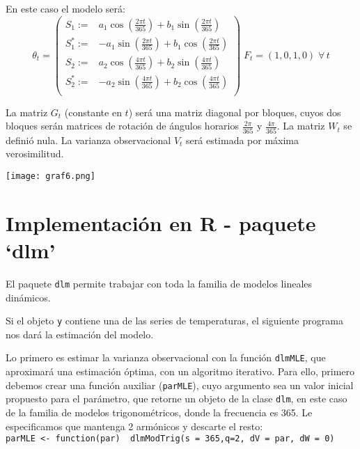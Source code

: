 \documentclass{article}
\begin{document}
En este caso el modelo será:
$$\theta_t=\left(\begin{array}{lr}
S_1:=& a_1\cos\left(\frac{2\pi t}{365}\right) + b_1 \sin\left(\frac{2\pi t}{365}\right) \\
S_1^*:=& -a_1\sin\left(\frac{2\pi t}{365}\right) + b_1 \cos\left(\frac{2\pi t}{365}\right) \\
S_2:= &a_2\cos\left(\frac{4\pi t}{365}\right) + b_2 \sin\left(\frac{4\pi t}{365}\right) \\
S_2^*:=& -a_2\sin\left(\frac{4\pi t}{365}\right) + b_2 \cos\left(\frac{4\pi t}{365}\right) \\
\end{array}\right)\; F_t=(1,0,1,0) \; \forall \, t$$

La matriz $G_t$ (constante en $t$) será una matriz diagonal por bloques, cuyos dos bloques serán matrices de rotación de ángulos horarios $\frac{2\pi}{365}$ y $\frac{4\pi}{365}$. La matriz $W_t$ se definió nula. La varianza observacional $V_t$ será estimada por máxima verosimilitud.

\begin{center}
\texttt{[image: graf6.png]}
\vspace{-.75em}
\label{fig:graf6}
\end{center}


\section{Implementación en R - paquete `dlm'}

El paquete \verb|dlm| permite trabajar con toda la familia de modelos lineales dinámicos. %

Si el objeto \verb|y| contiene una de las series de temperaturas, el siguiente programa nos dará la estimación del modelo.

Lo primero es estimar la varianza observacional con la función \verb|dlmMLE|, que aproximará una estimación óptima, con un algoritmo iterativo. Para ello, primero debemos crear una función auxiliar (\verb|parMLE|), cuyo argumento sea un valor inicial propuesto para el parámetro, que retorne un objeto de la clase \verb|dlm|, en este caso de la familia de modelos trigonométricos, donde la frecuencia es 365. Le especificamos que mantenga 2 armónicos y descarte el resto:\\
\verb|parMLE <- function(par)  dlmModTrig(s = 365,q=2, dV = par, dW = 0)|
\end{document}
